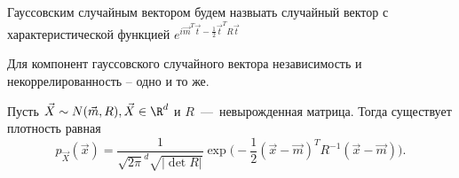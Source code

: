 \begin{theoremdefinition}
    Гауссовским случайным вектором будем назвыать случайный вектор с характеристической функцией $e^{i\vec{m}^T\vec{t} - \frac{1}{2}\vec{t}^{T}R\vec{t}}$
\end{theoremdefinition}
\begin{proposition}
    Для компонент гауссовского случайного вектора независимость и некоррелированность -- одно и то же.
\end{proposition}
\begin{proposition}
    Пусть $\vec{X} \sim N(\vec{m}, R), \vec{X} \in \R^d$ и $R$~---~невырожденная матрица.
    Тогда существует плотность равная
    \[
        p_{\vec{X}}(\vec{x}) = \dfrac{1}{\sqrt {2\pi}^d \sqrt {|\det R|}}\exp\biggr(-\dfrac{1}{2}(\vec{x} - \vec{m})^TR^{-1}(\vec{x} - \vec{m})\biggr).
    \]
\end{proposition}
